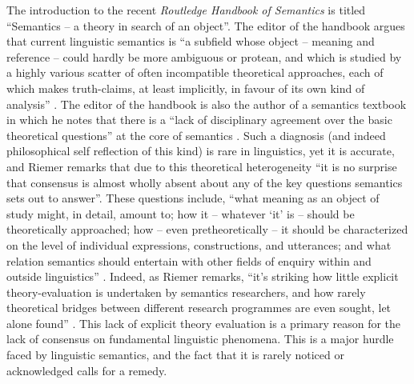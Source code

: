 \begin{refsection}
The introduction to the recent \textit{Routledge Handbook of Semantics} is titled “Semantics – a theory in search of an object”. The editor of the handbook argues that current linguistic semantics is “a subfield whose object – meaning and reference – could hardly be more ambiguous or protean, and which is studied by a highly various scatter of often incompatible theoretical approaches, each of which makes truth-claims, at least implicitly, in favour of its own kind of analysis” \citep[1]{Riemer2015}. The editor of the handbook is also the author of a semantics textbook in which he notes that there is a “lack of disciplinary agreement over the basic theoretical questions” at the core of semantics \citep[xiii]{Riemer2010}. Such a diagnosis (and indeed philosophical self reflection of this kind) is rare in linguistics, yet it is accurate, and Riemer remarks that due to this theoretical heterogeneity “it is no surprise that consensus is almost wholly absent about any of the key questions semantics sets out to answer”. These questions include, “what meaning as an object of study might, in detail, amount to; how it – whatever ‘it’ is – should be theoretically approached; how – even pretheoretically – it should be characterized on the level of individual expressions, constructions, and utterances; and what relation semantics should entertain with other fields of enquiry within and outside linguistics” \citep[1--2]{Riemer2015}. Indeed, as Riemer remarks, “it’s striking how little explicit theory-evaluation is undertaken by semantics researchers, and how rarely theoretical bridges between different research programmes are even sought, let alone found” \citep[2]{Riemer2015}. This lack of explicit theory evaluation is a primary reason for the lack of consensus on fundamental linguistic phenomena. This is a major hurdle faced by linguistic semantics, and the fact that it is rarely noticed or acknowledged calls for a remedy.


\end{refsection}
